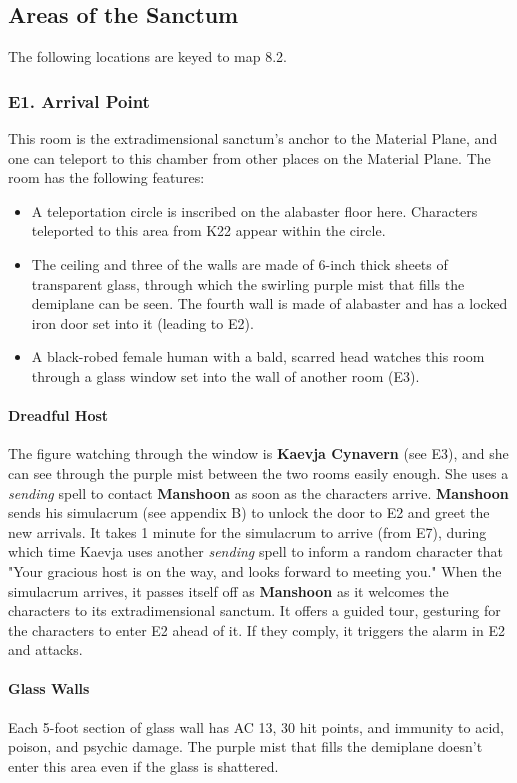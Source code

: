 \documentclass[10pt,a4paper,twoside,twocolumn,openany,nodeprecatedcode]{dndbook}
\begin{document}
\subsection{Areas of the Sanctum}
The following locations are keyed to map 8.2.
\subsubsection{E1. Arrival Point}
This room is the extradimensional sanctum's anchor to the Material Plane, and one can teleport to this chamber from other places on the Material Plane. The room has the following features:
\begin{itemize}

\item A teleportation circle is inscribed on the alabaster floor here. Characters teleported to this area from K22 appear within the circle.
\item The ceiling and three of the walls are made of 6-inch thick sheets of transparent glass, through which the swirling purple mist that fills the demiplane can be seen. The fourth wall is made of alabaster and has a locked iron door set into it (leading to E2).
\item A black-robed female human with a bald, scarred head watches this room through a glass window set into the wall of another room (E3).
\end{itemize}


\paragraph{Dreadful Host}
The figure watching through the window is \textbf{Kaevja Cynavern} (see E3), and she can see through the purple mist between the two rooms easily enough. She uses a \textit{sending} spell to contact \textbf{Manshoon} as soon as the characters arrive. \textbf{Manshoon} sends his simulacrum (see appendix B) to unlock the door to E2 and greet the new arrivals. It takes 1 minute for the simulacrum to arrive (from E7), during which time Kaevja uses another \textit{sending} spell to inform a random character that "Your gracious host is on the way, and looks forward to meeting you."
When the simulacrum arrives, it passes itself off as \textbf{Manshoon} as it welcomes the characters to its extradimensional sanctum. It offers a guided tour, gesturing for the characters to enter E2 ahead of it. If they comply, it triggers the alarm in E2 and attacks.
\paragraph{Glass Walls}
Each 5-foot section of glass wall has AC 13, 30 hit points, and immunity to acid, poison, and psychic damage. The purple mist that fills the demiplane doesn't enter this area even if the glass is shattered.
\end{document}
